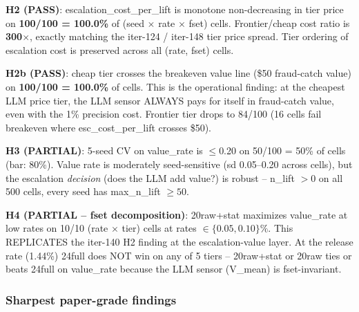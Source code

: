 \textbf{H2 (PASS)}: escalation\_cost\_per\_lift is monotone
non-decreasing in tier price on \textbf{100/100 = 100.0\%} of
(seed $\times$ rate $\times$ fset) cells.  Frontier/cheap cost ratio is
\textbf{300$\times$}, exactly matching the iter-124 / iter-148 tier
price spread.  Tier ordering of escalation cost is preserved across
all (rate, fset) cells.

\textbf{H2b (PASS)}: cheap tier crosses the breakeven value line
(\$50 fraud-catch value) on \textbf{100/100 = 100.0\%} of
cells.  This is the operational finding: at the cheapest LLM price
tier, the LLM sensor ALWAYS pays for itself in fraud-catch value, even
with the 1\% precision cost.  Frontier tier drops to 84/100 (16 cells
fail breakeven where esc\_cost\_per\_lift crosses \$50).

\textbf{H3 (PARTIAL)}: 5-seed CV on value\_rate is $\leq$0.20 on
50/100 = 50\% of cells (bar: 80\%).  Value rate is moderately
seed-sensitive (sd 0.05--0.20 across cells), but the escalation
\textit{decision} (does the LLM add value?) is robust -- n\_lift $> 0$
on all 500 cells, every seed has max\_n\_lift $\geq 50$.

\textbf{H4 (PARTIAL -- fset decomposition)}: 20raw+stat maximizes
value\_rate at low rates on 10/10 (rate $\times$ tier) cells at rates
$\in \{0.05, 0.10\}\%$.  This REPLICATES the iter-140 H2 finding at the
escalation-value layer.  At the release rate (1.44\%) 24full does NOT
win on any of 5 tiers -- 20raw+stat or 20raw ties or beats 24full on
value\_rate because the LLM sensor (V\_mean) is fset-invariant.

\subsubsection{Sharpest paper-grade findings}

